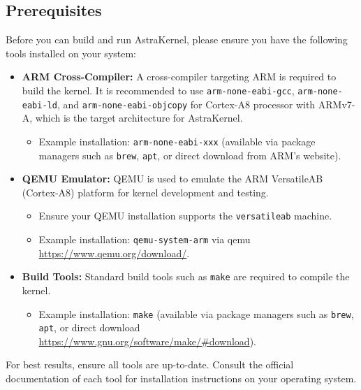 
\subsection{Prerequisites}

Before you can build and run AstraKernel, please ensure you have the following 
tools installed on your system:

\begin{itemize}
  \item \textbf{ARM Cross-Compiler:}  
  A cross-compiler targeting ARM is required to build the kernel. It 
  is recommended to use \texttt{arm-none-eabi-gcc}, \texttt{arm-none-eabi-ld}, 
  and \texttt{arm-none-eabi-objcopy} for Cortex-A8 processor with ARMv7-A, which is the target architecture
  for AstraKernel.
  \begin{itemize}
    \item Example installation: \texttt{arm-none-eabi-xxx} (available via package 
    managers such as \texttt{brew}, \texttt{apt}, or direct download from ARM's website).
  \end{itemize}
  
  \item \textbf{QEMU Emulator:}  
  QEMU is used to emulate the ARM VersatileAB (Cortex-A8) platform for kernel development and testing.
  \begin{itemize}
    \item Ensure your QEMU installation supports the \texttt{versatileab} machine.
    \item Example installation: \texttt{qemu-system-arm} via  qemu \url{https://www.qemu.org/download/}.
  \end{itemize}

  \item \textbf{Build Tools:}  
  Standard build tools such as \texttt{make} are required to compile the kernel.
  \begin{itemize}
    \item Example installation: \texttt{make} (available via package managers 
    such as \texttt{brew}, \texttt{apt}, or direct download \url{https://www.gnu.org/software/make/#download}).
  \end{itemize}
\end{itemize}

\noindent
For best results, ensure all tools are up-to-date. Consult the official documentation 
of each tool for installation instructions on your operating system.

